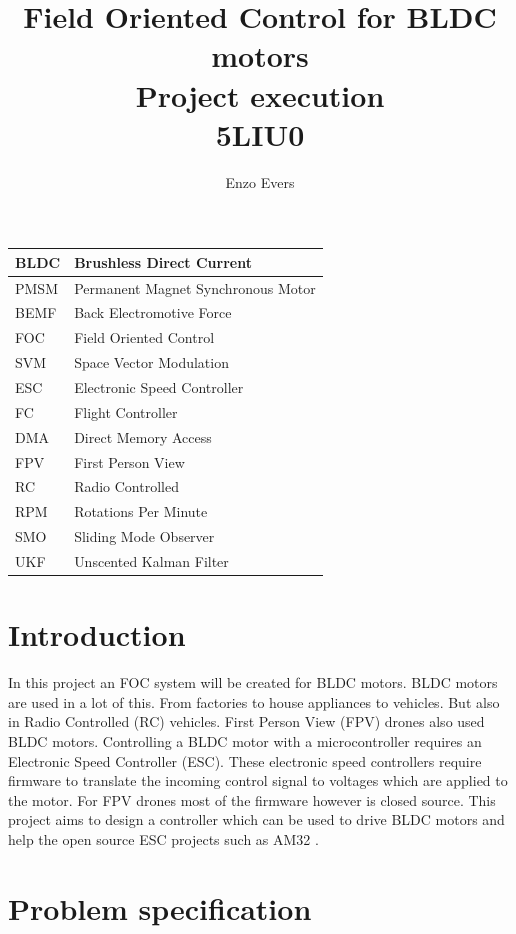 \documentclass[]{report}
\title{	\huge Field Oriented Control for BLDC motors \\
		\large Project execution \\ 5LIU0}
\author{Enzo Evers}
\begin{document}
\maketitle
\tableofcontents

\newpage

\begin{tabular}{|l|l|}
	\hline
	BLDC & Brushless Direct Current \\
	\hline
	PMSM & Permanent Magnet Synchronous Motor \\
	\hline
	BEMF & Back Electromotive Force \\
	\hline
	FOC & Field Oriented Control \\
	\hline
	SVM & Space Vector Modulation \\
	\hline
	ESC & Electronic Speed Controller \\
	\hline
	FC & Flight Controller \\
	\hline
	DMA & Direct Memory Access \\
	\hline
	FPV & First Person View \\
	\hline
	RC & Radio Controlled \\
	\hline
	RPM & Rotations Per Minute \\
	\hline
	SMO & Sliding Mode Observer \\
	\hline
	UKF & Unscented Kalman Filter \\
	\hline
\end{tabular}

\newpage

\chapter{Introduction}

In this project an FOC system will be created for BLDC motors. BLDC motors are used in a lot of this. From factories to house appliances to vehicles. But also in Radio Controlled (RC) vehicles. First Person View (FPV) drones also used BLDC motors. Controlling a BLDC motor with a microcontroller requires an Electronic Speed Controller (ESC). These electronic speed controllers require firmware to translate the incoming control signal to voltages which are applied to the motor. For FPV drones most of the firmware however is closed source. This project aims to design a controller which can be used to drive BLDC motors and help the open source ESC projects such as AM32 \cite{AM32_Git}.

\chapter{Problem specification}
\end{document}
